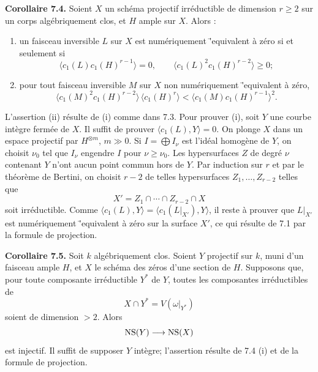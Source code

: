 \documentclass[11pt]{article}
\begin{document}
\textbf{Corollaire 7.4.} Soient $X$ un sch\'ema projectif irr\'eductible de dimension $r\ge2$ sur un corps alg\'ebriquement clos, et $H$ ample sur $X$. Alors :
\begin{enumerate}[label=\roman*)]
\item un faisceau inversible $L$ sur $X$ est num\'eriquement \='equivalent \`a z\'ero si et seulement si
\[
   \langle c_1(L)c_1(H)^{r-1}\rangle=0,
   \qquad
   \langle c_1(L)^2c_1(H)^{r-2}\rangle\ge0;
\]
\item pour tout faisceau inversible $M$ sur $X$ non num\'eriquement \='equivalent \`a z\'ero,
\[
   \langle c_1(M)^2c_1(H)^{r-2}\rangle\,\langle c_1(H)^r\rangle
   <\langle c_1(M)c_1(H)^{r-1}\rangle^2.
\]
\end{enumerate}
L'assertion (ii) r\'esulte de (i) comme dans 7.3. Pour prouver (i), soit $Y$ une courbe int\`egre ferm\'ee de $X$. Il suffit de prouver $\langle c_1(L),Y\rangle=0$. On plonge $X$ dans un espace projectif par $H^{\otimes m}$, $m\gg0$. Si $I=\bigoplus I_\nu$ est l'id\'eal homog\`ene de $Y$, on choisit $\nu_0$ tel que $I_\nu$ engendre $I$ pour $\nu\ge\nu_0$. Les hypersurfaces $Z$ de degr\'e $\nu$ contenant $Y$ n'ont aucun point commun hors de $Y$. Par induction sur $r$ et par le th\'eor\`eme de Bertini, on choisit $r-2$ de telles hypersurfaces $Z_1,\ldots,Z_{r-2}$ telles que
\[
   X'=Z_1\cap\cdots\cap Z_{r-2}\cap X
\]
soit irr\'eductible. Comme $\langle c_1(L),Y\rangle=\langle c_1(L|_{X'}),Y\rangle$, il reste \`a prouver que $L|_{X'}$ est num\'eriquement \='equivalent \`a z\'ero sur la surface $X'$, ce qui r\'esulte de 7.1 par la formule de projection.

\textbf{Corollaire 7.5.} Soit $k$ alg\'ebriquement clos. Soient $Y$ projectif sur $k$, muni d'un faisceau ample $H$, et $X$ le sch\'ema des z\'eros d'une section de $H$. Supposons que, pour toute composante irr\'eductible $Y^*$ de $Y$, toutes les composantes irr\'eductibles de
\[
   X\cap Y^*=V(\omega|_{Y^*})
\]
soient de dimension $>2$. Alors
\[
   \operatorname{NS}(Y)\longrightarrow \operatorname{NS}(X)
\]
est injectif. Il suffit de supposer $Y$ int\`egre; l'assertion r\'esulte de 7.4 (i) et de la formule de projection.
\end{document}
